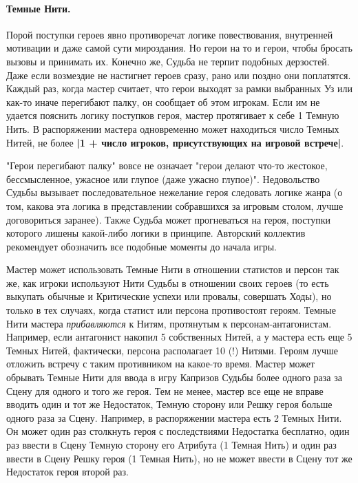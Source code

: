 \paragraph{Темные Нити.} 
Порой поступки героев явно противоречат логике повествования, внутренней мотивации и даже самой сути мироздания. Но герои на то и герои, чтобы бросать вызовы и принимать их. Конечно же, Судьба не терпит подобных дерзостей. Даже если возмездие не настигнет героев сразу, рано или поздно они поплатятся.
\newline Каждый раз, когда мастер считает, что герои выходят за рамки выбранных Уз или как-то иначе перегибают палку, он сообщает об этом игрокам. Если им не удается пояснить логику поступков героя, мастер протягивает к себе 1 Темную Нить.
\newline В распоряжении мастера одновременно может находиться число Темных Нитей, не более \textbf{|1 + число игроков, присутствующих на игровой встрече|}.
\begin{tcolorbox}
"Герои перегибают палку" вовсе не означает "герои делают что-то жестокое, бессмысленное, ужасное или глупое (даже ужасно глупое)". Недовольство Судьбы вызывает последовательное нежелание героя следовать логике жанра (о том, какова эта логика в представлении собравшихся за игровым столом, лучше договориться заранее). Также Судьба может прогневаться на героя, поступки которого лишены какой-либо логики в принципе. Авторский коллектив рекомендует обозначить все подобные моменты до начала игры.
\end{tcolorbox}
Мастер может использовать Темные Нити в отношении статистов и персон так же, как игроки используют Нити Судьбы в отношении своих героев (то есть выкупать обычные и Критические успехи или провалы, совершать Ходы), но только в тех случаях, когда статист или персона противостоят героям. Темные Нити мастера \textit{прибавляются} к Нитям, протянутым к персонам-антагонистам. Например, если антагонист накопил 5 собственных Нитей, а у мастера есть еще 5 Темных Нитей, фактически, персона располагает 10 (!) Нитями. Героям лучше отложить встречу с таким противником на какое-то время.
\newline Мастер может обрывать Темные Нити для ввода в игру Капризов Судьбы более одного раза за Сцену для одного и того же героя. Тем не менее, мастер все еще не вправе вводить один и тот же Недостаток, Темную сторону или Решку героя больше одного раза за Сцену. 
\newline Например, в распоряжении мастера есть 2 Темных Нити. Он может один раз столкнуть героя с последствиями Недостатка бесплатно, один раз ввести в Сцену Темную сторону его Атрибута (1 Темная Нить) и один раз ввести в Сцену Решку героя (1 Темная Нить), но не может ввести в Сцену тот же Недостаток героя второй раз.
